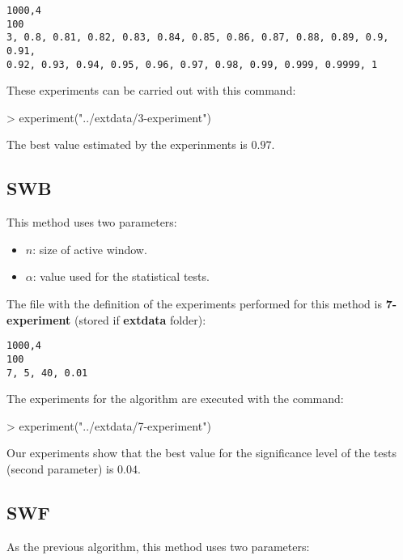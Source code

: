 \documentclass{article}
\begin{document}
\begin{verbatim}
1000,4
100
3, 0.8, 0.81, 0.82, 0.83, 0.84, 0.85, 0.86, 0.87, 0.88, 0.89, 0.9, 0.91,
0.92, 0.93, 0.94, 0.95, 0.96, 0.97, 0.98, 0.99, 0.999, 0.9999, 1
\end{verbatim}

These experiments can be carried out with this command:

\begin{Schunk}
\begin{Sinput}
> experiment("../extdata/3-experiment")
\end{Sinput}
\end{Schunk}

The best value estimated by the experinments is $0.97$.

\subsection{SWB}

This method uses two parameters:

\begin{itemize}
\item $n$: size of active window.
\item $\alpha$: value used for the statistical tests.
\end{itemize}

The file with the definition of the experiments performed for this method
is \textbf{7-experiment} (stored if \textbf{extdata} folder):

\begin{verbatim}
1000,4
100
7, 5, 40, 0.01
\end{verbatim}

The experiments for the algorithm are executed with the command:

\begin{Schunk}
\begin{Sinput}
> experiment("../extdata/7-experiment")
\end{Sinput}
\end{Schunk}

Our experiments show that the best value for the significance level of the tests
(second parameter) is $0.04$.

\subsection{SWF}

As the previous algorithm, this method uses two parameters:
\end{document}
